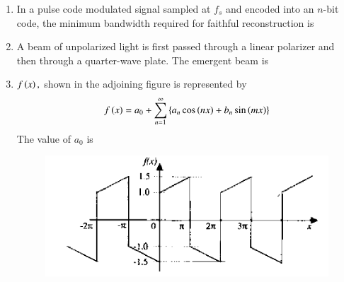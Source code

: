 \documentclass[journal,12pt,onecolumn]{IEEEtran}
\theoremstyle{remark}
\begin{document}
\begin{enumerate}
\hfill{}

\begin{enumerate}
\end{enumerate}

\item In a pulse code modulated  signal sampled at $f_s$ and encoded into an $n$-bit code, the minimum bandwidth required for faithful reconstruction is

\hfill{}
\begin{enumerate}
\end{enumerate}

\item A beam of unpolarized light is first passed through a linear polarizer and then through a quarter-wave plate. The emergent beam is

\hfill{}
\begin{enumerate}
\end{enumerate}

\item $f\left(x\right),$ shown in the adjoining figure is represented by
$$f\left(x\right) = a_0 + \sum_{n=1}^{\infty}
\left\{
a_n \cos\left(nx\right) + b_n \sin\left(mx\right)
\right\}
$$
The value of $a_0$ is
\\
\begin{figure}[H]
    \centering
    \includegraphics[width=0.7\columnwidth]{q10}
    \caption*{}
    \label{Q10}
\end{figure}


\end{enumerate}
\end{document}

